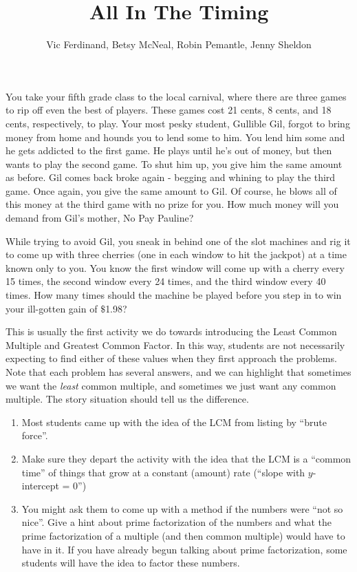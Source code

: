 \documentclass{ximera}
\title{All In The Timing}
\author{Vic Ferdinand, Betsy McNeal, Robin Pemantle, Jenny Sheldon}
\begin{document}
\begin{abstract} \end{abstract}
\maketitle



\begin{problem}
 You take your fifth grade class to the local carnival, where there are three games to rip off even the best of players.  These games cost 21 cents, 8 cents, and 18 cents, respectively, to play.  Your most pesky student, Gullible Gil, forgot to bring money from home and hounds you to lend some to him.  You lend him some and he gets addicted to the first game.  He plays until he's out of money, but then wants to play the second game.  To shut him up, you give him the same amount as before.  Gil comes back broke again - begging and whining to play the third game.  Once again, you give the same amount to Gil.  Of course, he blows all of this money at the third game with no prize for you.  How much money will you demand from Gil's mother, No Pay Pauline?
\end{problem}

\begin{problem}
 While trying to avoid Gil, you sneak in behind one of the slot machines and rig it to come up with three cherries (one in each window to hit the jackpot) at a time known only to you. You know the first window will come up with a cherry every 15 times, the second window every 24 times, and the third window every 40 times.  How many times should the machine be played before you step in to win your ill-gotten gain of $\$$1.98?

\end{problem}

\newpage
\begin{instructorNotes}
This is usually the first activity we do towards introducing the Least Common Multiple and Greatest Common Factor.  In this way, students are not necessarily expecting to find either of these values when they first approach the problems.  Note that each problem has several answers, and we can highlight that sometimes we want the {\em least} common multiple, and sometimes we just want any common multiple.  The story situation should tell us the difference.

\begin{enumerate}
	\item Most students came up with the idea of the LCM from listing by ``brute force''.
	\item Make sure they depart the activity with the idea that the LCM is a ``common time'' of things that grow at a constant (amount) rate (``slope with $y$-intercept = 0'')
	\item You might ask them to come up with a method if the numbers were ``not so nice''.  Give a hint about prime factorization of the numbers and what the prime factorization of a multiple (and then common multiple) would have to have in it.  If you have already begun talking about prime factorization, some students will have the idea to factor these numbers.
\end{enumerate}
\end{instructorNotes}
\end{document}
